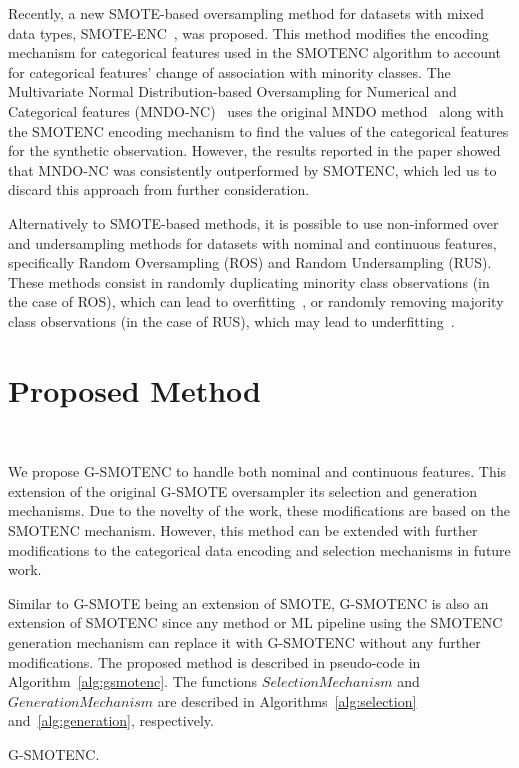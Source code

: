 \documentclass[preprint,12pt]{elsarticle}
\begin{document}
{Recently, a new SMOTE-based oversampling method for
datasets with mixed data types, SMOTE-ENC~\cite{mukherjee2021smote}, was
proposed. This method modifies the encoding mechanism for categorical features
used in the SMOTENC algorithm to account for categorical features' change of
association with minority classes. The Multivariate Normal Distribution-based
Oversampling for Numerical and Categorical features
(MNDO-NC)~\cite{ambai2019multivariate} uses the original MNDO
method~\cite{ambai2018mndo} along with the SMOTENC encoding mechanism to find
the values of the categorical features for the synthetic observation. However,
the results reported in the paper showed that MNDO-NC was consistently
outperformed by SMOTENC, which led us to discard this approach from further
consideration.

Alternatively to SMOTE-based methods, it is possible to use non-informed over
and undersampling methods for datasets with nominal and continuous features,
specifically Random Oversampling (ROS) and Random Undersampling (RUS). These
methods consist in randomly duplicating minority class observations (in the
case of ROS), which can lead to overfitting~\cite{park2021combined,
batista2004study}, or randomly removing majority class observations (in the
case of RUS), which may lead to underfitting~\cite{bansal2021analysis}.


\section{Proposed Method}~\label{sec:proposed_method}

We propose G-SMOTENC to handle both nominal and continuous features. This
extension of the original G-SMOTE oversampler its selection and generation
mechanisms. Due to the novelty of the work, these modifications are based on
the SMOTENC mechanism. However, this method can be extended with further
modifications to the categorical data encoding and selection mechanisms in
future work. 

Similar to G-SMOTE being an extension of SMOTE, G-SMOTENC is also an extension
of SMOTENC since any method or ML pipeline using the SMOTENC generation
mechanism can replace it with G-SMOTENC without any further modifications. The
proposed method is described in pseudo-code in Algorithm~\ref{alg:gsmotenc}.
The functions $SelectionMechanism$ and $GenerationMechanism$ are described in
Algorithms~\ref{alg:selection} and~\ref{alg:generation}, respectively.

\begin{algorithm}
    \caption{G-SMOTENC.}\label{alg:gsmotenc}
    \DontPrintSemicolon%
    

\end{algorithm}}
\end{document}

